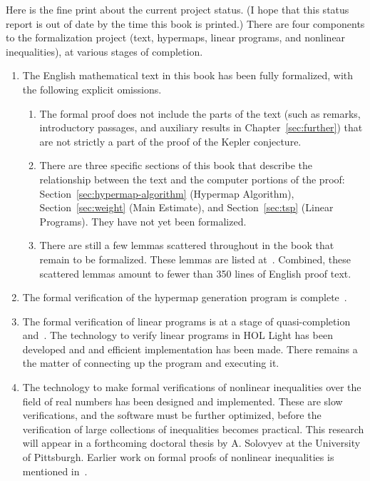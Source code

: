 Here is the fine print about the current project status. (I hope that
this status report is out of date by the time this book is printed.)
There are four components to the formalization project (text, hypermaps, linear programs,
and nonlinear inequalities), at various stages of completion.
\begin{enumerate}
\item
The English mathematical text in this book has been fully
  formalized, with the following explicit omissions.
\begin{enumerate}
\item The formal proof does not include the parts of the text (such
  as remarks, introductory passages, and auxiliary results in 
  Chapter~\ref{sec:further}) that are
  not strictly a part of the proof of the Kepler conjecture.
\item There are three specific sections of this book that describe
  the relationship between the text and the computer portions of
  the proof: Section~\ref{sec:hypermap-algorithm} (Hypermap Algorithm), 
  Section~\ref{sec:weight} (Main Estimate), and Section~\ref{sec:tsp} (Linear Programs).
  They have not yet been formalized.
\item There are still a few lemmas scattered throughout in the book that remain to be formalized.
These lemmas are listed at~\cite{website:FlyspeckProject}.
Combined, these scattered lemmas amount to fewer than 350 lines of English proof text.
\end{enumerate}
\item The formal verification of the hypermap generation program is complete~\cite{Nipkow:2005:Tame}.
\item The formal verification of linear programs is at a stage of 
quasi-completion~\cite{Obua:2005:Thesis} and~\cite{Solovyev:LP}.
 The technology to verify linear programs in HOL Light has been developed and 
  and efficient implementation has been made.
  There remains a the matter of connecting up the program and executing it.
\item The technology to make formal verifications of nonlinear inequalities over the
field of real numbers has been designed and implemented.   These are slow verifications,
and the software must be further optimized, before the verification of large collections
of inequalities becomes practical.  This research will appear in a forthcoming doctoral 
thesis by A. Solovyev
at the University of Pittsburgh.  Earlier work on formal proofs of nonlinear inequalities
is mentioned in~\cite{HHMNOZ}.
\end{enumerate}


